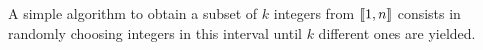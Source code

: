 A simple algorithm to obtain a subset of $k$ integers from $\llbracket1, n\rrbracket$ consists in randomly choosing integers in this interval until $k$ different ones are yielded. 